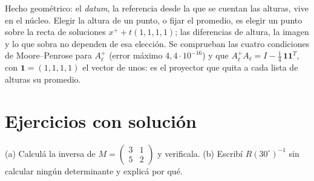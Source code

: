 Hecho geométrico: el \emph{datum}, la referencia desde la que se cuentan las alturas, vive en
el núcleo. Elegir la altura de un punto, o fijar el
promedio, es elegir un punto sobre la recta de soluciones \(x^{+}+t(1,1,1,1)\); las
diferencias de altura, la imagen y lo que sobra no dependen de esa elección. Se comprueban las
cuatro condiciones de Moore--Penrose para \(A_\ell^{+}\) (error máximo
\(4{,}4\cdot10^{-16}\)) y que \(A_\ell^{+}A_\ell=I-\tfrac14\,\mathbf 1\mathbf 1^T\), con
\(\mathbf 1=(1,1,1,1)\) el vector de unos: es el
proyector que quita a cada lista de alturas su promedio.

\section{Ejercicios con solución}

\begin{ejercicio}\label{ex:inv-2x2-rotacion}
(a) Calculá la inversa de \(M=\begin{pmatrix}3&1\\5&2\end{pmatrix}\) y verificala.
(b) Escribí \(R(30^\circ)^{-1}\) sin calcular ningún determinante y explicá por qué.
\end{ejercicio}

